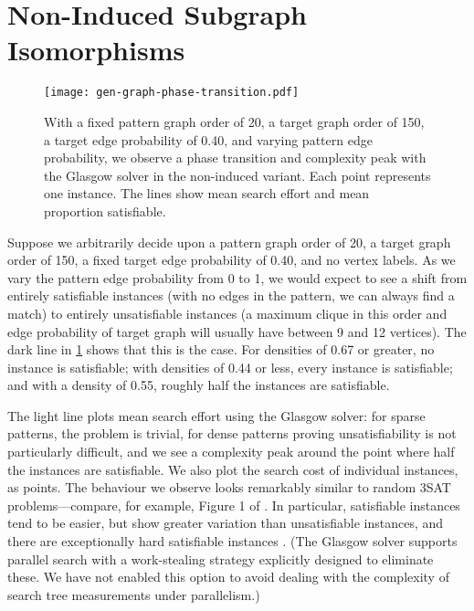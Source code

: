 \documentclass[twoside,11pt]{article}
\newcommand{\citet}[1]{\citeA{#1}}
\newcommand{\citep}[1]{\cite{#1}}
\begin{document}
\section{Non-Induced Subgraph Isomorphisms}

\begin{figure}[tb]
    \centering\texttt{[image: gen-graph-phase-transition.pdf]}
    \caption{With a fixed pattern graph order of 20, a target graph order of 150, a target edge
        probability of 0.40, and varying pattern edge probability, we observe a phase transition and
        complexity peak with the Glasgow solver in the non-induced variant. Each point represents
        one instance. The lines show mean search effort and mean proportion satisfiable.}
    \label{figure:phase-transition}
\end{figure}

Suppose we arbitrarily decide upon a pattern graph order of 20, a target graph order of 150, a fixed
target edge probability of 0.40, and no vertex labels. As we vary the pattern edge probability from
0 to 1, we would expect to see a shift from entirely satisfiable instances (with no edges in the
pattern, we can always find a match) to entirely unsatisfiable instances (a maximum clique in this
order and edge probability of target graph will usually have between 9 and 12 vertices). The dark
line in \cref{figure:phase-transition} shows that this is the case. For densities of 0.67 or
greater, no instance is satisfiable; with densities of 0.44 or less, every instance is satisfiable;
and with a density of 0.55, roughly half the instances are satisfiable.

The light line plots mean search effort using the Glasgow solver: for sparse patterns, the problem
is trivial, for dense patterns proving unsatisfiability is not particularly difficult, and we see a
complexity peak around the point where half the instances are satisfiable.  We also plot the search
cost of individual instances, as points. The behaviour we observe looks remarkably similar to random
3SAT problems---compare, for example, Figure 1 of \citet{LeytonBrown:2014}. In particular,
satisfiable instances tend to be easier, but show greater variation than unsatisfiable instances, and
there are exceptionally hard satisfiable instances \citep{Smith:1997}. (The Glasgow solver supports
parallel search with a work-stealing strategy explicitly designed to eliminate these. We have not
enabled this option to avoid dealing with the complexity of search tree measurements under
parallelism.)
\end{document}
